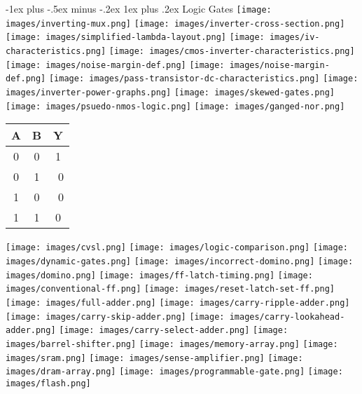 \documentclass[letter,8pt,landscape]{article}
\makeatletter
\renewcommand{\subsubsection}{\@startsection{subsubsection}{3}{0mm}%
                                {-1ex plus -.5ex minus -.2ex}%
                                {1ex plus .2ex}%
                                {\normalfont\small\bfseries}}
\makeatother
\begin{document}
\begin{multicols}{3}
  \subsubsection{Logic Gates}
  \texttt{[image: images/inverting-mux.png]}
  \texttt{[image: images/inverter-cross-section.png]}
  \texttt{[image: images/simplified-lambda-layout.png]}
  \texttt{[image: images/iv-characteristics.png]}
  \texttt{[image: images/cmos-inverter-characteristics.png]}
  \texttt{[image: images/noise-margin-def.png]}
  \texttt{[image: images/noise-margin-def.png]}
  \texttt{[image: images/pass-transistor-dc-characteristics.png]}
  \texttt{[image: images/inverter-power-graphs.png]}
  \texttt{[image: images/skewed-gates.png]}
  \texttt{[image: images/psuedo-nmos-logic.png]}
  \texttt{[image: images/ganged-nor.png]}
  \vspace*{-0.25in}
  \begin{center}
    \begin{tabular}{ |c|c|c| } 
      \hline
      A & B & Y \\
      \hline
      0 & 0 & 1 \\
      \hline
      0 & 1 & ~0 \\
      \hline
      1 & 0 & ~0 \\
      \hline
      1 & 1 & 0 \\
      \hline
    \end{tabular}
  \end{center}
  \texttt{[image: images/cvsl.png]}
  \texttt{[image: images/logic-comparison.png]}
  \texttt{[image: images/dynamic-gates.png]}
  \texttt{[image: images/incorrect-domino.png]}
  \texttt{[image: images/domino.png]}
  \texttt{[image: images/ff-latch-timing.png]}
  \texttt{[image: images/conventional-ff.png]}
  \texttt{[image: images/reset-latch-set-ff.png]}
  \texttt{[image: images/full-adder.png]}
  \texttt{[image: images/carry-ripple-adder.png]}
  \texttt{[image: images/carry-skip-adder.png]}
  \texttt{[image: images/carry-lookahead-adder.png]}
  \texttt{[image: images/carry-select-adder.png]}
  \texttt{[image: images/barrel-shifter.png]}
  \texttt{[image: images/memory-array.png]}
  \texttt{[image: images/sram.png]}
  \texttt{[image: images/sense-amplifier.png]}
  \texttt{[image: images/dram-array.png]}
  \texttt{[image: images/programmable-gate.png]}
  \texttt{[image: images/flash.png]}
  




\end{multicols}
\end{document}
